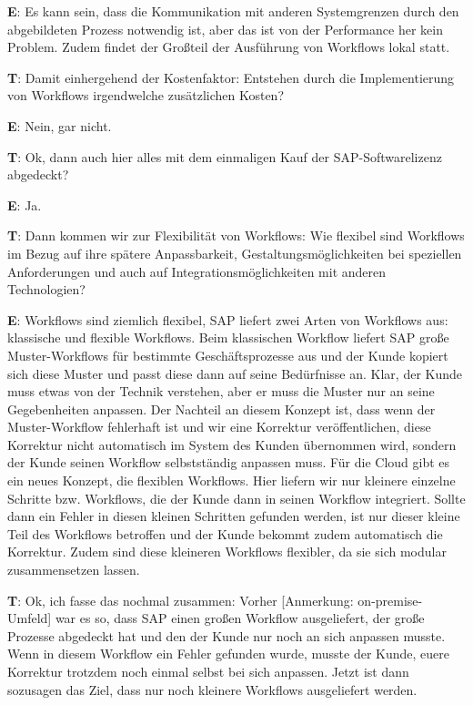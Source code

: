 \begin{list}{X:}{\setlength{\labelsep}{5mm}}
    \item[\textbf{E}:] Es kann sein, dass die Kommunikation mit anderen Systemgrenzen durch den abgebildeten Prozess notwendig ist, aber das ist von der Performance her kein Problem. Zudem findet der Gro{\ss}teil der Ausführung von Workflows lokal statt.
    \item[\textbf{T}:] Damit einhergehend der Kostenfaktor: Entstehen durch die Implementierung von Workflows irgendwelche zusätzlichen Kosten?
    \item[\textbf{E}:] Nein, gar nicht.
    \item[\textbf{T}:] Ok, dann auch hier alles mit dem einmaligen Kauf der SAP-Softwarelizenz abgedeckt?
    \item[\textbf{E}:] Ja.
    \item[\textbf{T}:] Dann kommen wir zur Flexibilität von Workflows: Wie flexibel sind Workflows im Bezug auf ihre spätere Anpassbarkeit, Gestaltungsmöglichkeiten bei speziellen Anforderungen und auch auf Integrationsmöglichkeiten mit anderen Technologien?
    \item[\textbf{E}:] Workflows sind ziemlich flexibel, SAP liefert zwei Arten von Workflows aus: klassische und flexible Workflows. Beim klassischen Workflow liefert SAP gro{\ss}e Muster-Workflows für bestimmte Geschäftsprozesse aus und der Kunde kopiert sich diese Muster und passt diese dann auf seine Bedürfnisse an. Klar, der Kunde muss etwas von der Technik verstehen, aber er muss die Muster nur an seine Gegebenheiten anpassen. Der Nachteil an diesem Konzept ist, dass wenn der Muster-Workflow fehlerhaft ist und wir eine Korrektur veröffentlichen, diese Korrektur nicht automatisch im System des Kunden übernommen wird, sondern der Kunde seinen Workflow selbstständig anpassen muss. Für die Cloud gibt es ein neues Konzept, die flexiblen Workflows. Hier liefern wir nur kleinere einzelne Schritte bzw. Workflows, die der Kunde dann in seinen Workflow integriert. Sollte dann ein Fehler in diesen kleinen Schritten gefunden werden, ist nur dieser kleine Teil des Workflows betroffen und der Kunde bekommt zudem automatisch die Korrektur. Zudem sind diese kleineren Workflows flexibler, da sie sich modular zusammensetzen lassen.
    \item[\textbf{T}:] Ok, ich fasse das nochmal zusammen: Vorher [Anmerkung: on-premise-Umfeld] war es so, dass SAP einen gro{\ss}en Workflow ausgeliefert, der gro{\ss}e Prozesse abgedeckt hat und den der Kunde nur noch an sich anpassen musste. Wenn in diesem Workflow ein Fehler gefunden wurde, musste der Kunde, euere Korrektur trotzdem noch einmal selbst bei sich anpassen. Jetzt ist dann sozusagen das Ziel, dass nur noch kleinere Workflows ausgeliefert werden.

\end{list}
